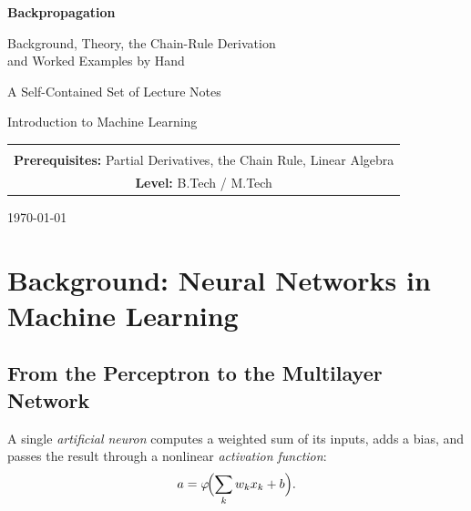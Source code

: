\documentclass[11pt,a4paper]{report}
\theoremstyle{definition}
\theoremstyle{remark}
\begin{document}
\begin{titlepage}
\centering
\vspace*{2cm}
{\Huge\bfseries Backpropagation\par}
\vspace{0.6cm}
{\Large Background, Theory, the Chain-Rule Derivation\\[2pt]
and Worked Examples by Hand\par}
\vspace{1.5cm}
{\large A Self-Contained Set of Lecture Notes\par}
\vspace{0.4cm}
{\large Introduction to Machine Learning\par}
\vspace{2.5cm}
\begin{tabular}{c}
\hline\\[-6pt]
\textbf{Prerequisites:} Partial Derivatives, the Chain Rule, Linear Algebra\\[4pt]
\textbf{Level:} B.Tech / M.Tech\\[4pt]
\hline
\end{tabular}
\vfill
{\large \today\par}
\end{titlepage}

\tableofcontents
\clearpage

\chapter{Background: Neural Networks in Machine Learning}

\section{From the Perceptron to the Multilayer Network}
A single \emph{artificial neuron} computes a weighted sum of its inputs, adds a
bias, and passes the result through a nonlinear \emph{activation function}:
\[
a=\varphi\!\Bigl(\sum_k w_k x_k + b\Bigr).
\]
\end{document}
